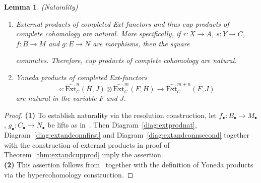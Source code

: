 \documentclass[12pt, a4paper]{article}
\numberwithin{equation}{section}
\newtheorem{lem}[thm]{Lemma}
\theoremstyle{empty}
\theoremstyle{nonumberplain}
\newtheorem{proof}{Proof}
\begin{document}
\begin{lem}\label{lem:cohomprodsnatural}
(Naturality)
\begin{enumerate}
    \item External products of completed Ext-functors and thus cup products of complete cohomology are natural. More specifically, if $r: X \rightarrow A$, $s: Y \rightarrow C$, $f: B \rightarrow M$ and $g: E \rightarrow N$ are morphisms, then the square
    \begin{center}
    \end{center}
    commutes. Therefore, cup products of complete cohomology are natural.
    \item Yoneda products of completed Ext-functors
    \[ \circ: \widehat{\mathrm{Ext}}_{\mathcal{C}}^n(H, J) \otimes \widehat{\mathrm{Ext}}_{\mathcal{C}}^m(F, H) \rightarrow \widehat{\mathrm{Ext}}_{\mathcal{C}}^{m+n}(F, J) \]
    are natural in the variable $F$ and $J$.
\end{enumerate}
\end{lem}

\begin{proof}
\textbf{(1)} To establish naturality via the resolution construction, let $f_{\bullet}: B_{\bullet} \rightarrow M_{\bullet}$, $g_{\bullet}: C_{\bullet} \rightarrow N_{\bullet}$ be lifts as in~\cite[Definition~4.2]{ghe24}. Then Diagram~\ref{diag:extprodnat}, Diagram~\ref{diag:extandconnfirst} and Diagram~\ref{diag:extandconnsecond} together with the construction of external products in proof of Theorem~\ref{thm:extandcupprod} imply the assertion. \\

\textbf{(2)} This assertion follows from~\cite[Definition~6.4]{ghe24} together with the definition of Yoneda products via the hypercohomology construction.
\end{proof}
\end{document}
